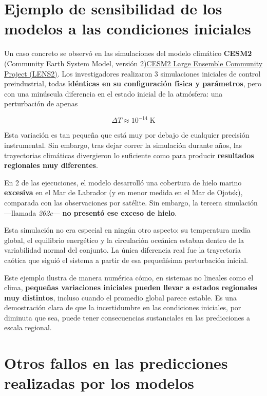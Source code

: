 \documentclass[
  11pt,
  a4paper,
  DIV=11,
  numbers=noendperiod]{scrreprt}
\begin{document}
\section{Ejemplo de sensibilidad de los modelos a las condiciones
iniciales}\label{ejemplo-de-sensibilidad-de-los-modelos-a-las-condiciones-iniciales}

Un caso concreto se observó en las simulaciones del modelo climático
\textbf{CESM2} (Community Earth System Model, versión
2)\href{https://www.cesm.ucar.edu/community-projects/lens2}{CESM2 Large
Ensemble Community Project (LENS2)}. Los investigadores realizaron 3
simulaciones iniciales de control preindustrial, todas \textbf{idénticas
en su configuración física y parámetros}, pero con una minúscula
diferencia en el estado inicial de la atmósfera: una perturbación de
apenas

\[
\Delta T \approx 10^{-14} \; \text{K}
\]

Esta variación es tan pequeña que está muy por debajo de cualquier
precisión instrumental. Sin embargo, tras dejar correr la simulación
durante años, las trayectorias climáticas divergieron lo suficiente como
para producir \textbf{resultados regionales muy diferentes}.

En 2 de las ejecuciones, el modelo desarrolló una cobertura de hielo
marino \textbf{excesiva} en el Mar de Labrador (y en menor medida en el
Mar de Ojotsk), comparada con las observaciones por satélite. Sin
embargo, la tercera simulación ---llamada \emph{262c}--- \textbf{no
presentó ese exceso de hielo}.

Esta simulación no era especial en ningún otro aspecto: su temperatura
media global, el equilibrio energético y la circulación oceánica estaban
dentro de la variabilidad normal del conjunto. La única diferencia real
fue la trayectoria caótica que siguió el sistema a partir de esa
pequeñísima perturbación inicial.

Este ejemplo ilustra de manera numérica cómo, en sistemas no lineales
como el clima, \textbf{pequeñas variaciones iniciales pueden llevar a
estados regionales muy distintos}, incluso cuando el promedio global
parece estable. Es una demostración clara de que la incertidumbre en las
condiciones iniciales, por diminuta que sea, puede tener consecuencias
sustanciales en las predicciones a escala regional.

\section{Otros fallos en las predicciones realizadas por los
modelos}\label{otros-fallos-en-las-predicciones-realizadas-por-los-modelos}
\end{document}
